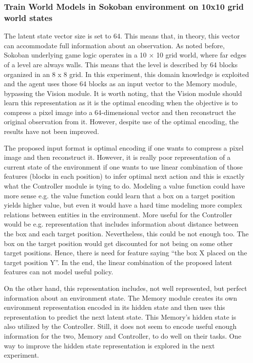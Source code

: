 \subsubsection{Train World Models in Sokoban environment on 10x10 grid world states}

The latent state vector size is set to 64. This means that, in theory, this vector can accommodate full information about an observation. As noted before, Sokoban underlying game logic operates in a 10 × 10 grid world, where far edges of a level are always walls. This means that the level is described by 64 blocks organized in an 8 x 8 grid. In this experiment, this domain knowledge is exploited and the agent uses those 64 blocks as an input vector to the Memory module, bypassing the Vision module. It is worth noting, that the Vision module should learn this representation as it is the optimal encoding when the objective is to compress a pixel image into a 64-dimensional vector and then reconstruct the original observation from it. However, despite use of the optimal encoding, the results have not been improved.

The proposed input format is optimal encoding if one wants to compress a pixel image and then reconstruct it. However, it is really poor representation of a current state of the environment if one wants to use linear combination of those features (blocks in each position) to infer optimal next action and this is exactly what the Controller module is tying to do. Modeling a value function could have more sense e.g. the value function could learn that a box on a target position yields higher value, but even it would have a hard time modeling more complex relations between entities in the environment. More useful for the Controller would be e.g. representation that includes information about distance between the box and each target position. Nevertheless, this could be not enough too. The box on the target position would get discounted for not being on some other target positions. Hence, there is need for feature saying “the box X placed on the target position Y”. In the end, the linear combination of the proposed latent features can not model useful policy.

On the other hand, this representation includes, not well represented, but perfect information about an environment state. The Memory module creates its own environment representation encoded in its hidden state and then uses this representation to predict the next latent state. This Memory's hidden state is also utilized by the Controller. Still, it does not seem to encode useful enough information for the two, Memory and Controller, to do well on their tasks. One way to improve the hidden state representation is explored in the next experiment.

